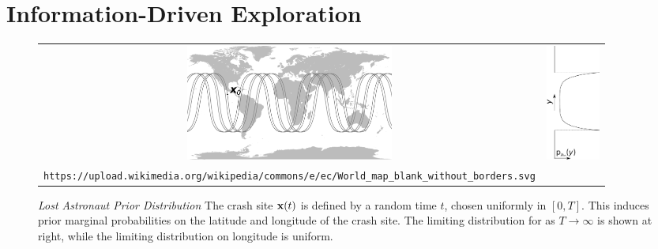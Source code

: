 \section{Information-Driven Exploration}

\begin{figure}
\centering
\begin{tabular}{cc}
\includegraphics[height=1.5in]{world_map} &
\includegraphics[height=1.5in]{world_map_belief}
\\
\tiny{\texttt{https://upload.wikimedia.org/wikipedia/commons/e/ec/World\_map\_blank\_without\_borders.svg}}
\end{tabular}
\caption{\emph{Lost Astronaut Prior Distribution}
The crash site $\mathbf{x}(t)$ is defined by a random time $t$, chosen uniformly in $[0,T]$.
This induces prior marginal probabilities on the latitude and longitude of the crash site.
The limiting distribution for as $T\to\infty$ is shown at right, while the limiting distribution
on longitude is uniform.
}
\label{fig: lost astronaut}
\end{figure}

